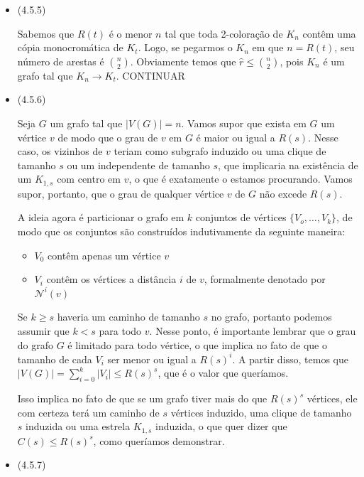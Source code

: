 \documentclass{article}
\begin{document}
\begin{itemize}
	\item (4.5.5)

	      Sabemos que \(R(t)\) é o menor \(n\) tal que toda 2-coloração de \(K_n\) contêm uma cópia monocromática de \(K_t\). Logo, se pegarmos o \(K_n\) em que \(n = R(t)\), seu número de arestas é \(\binom{n}{2}\). Obviamente temos que
	      \(\hat{r} \leq \binom{n}{2}\), pois \(K_n\) é um grafo tal que \(K_n \rightarrow K_t\). CONTINUAR

	\item (4.5.6)

	      Seja \(G\) um grafo tal que \(|V(G)| = n\). Vamos supor que exista em \(G\) um vértice \(v\) de modo que o grau de \(v\) em \(G\) é maior ou igual a \(R(s)\).
	      Nesse caso, os vizinhos de \(v\) teriam como subgrafo induzido ou uma clique de tamanho \(s\) ou um independente de tamanho \(s\), que implicaria na existência de um \(K_{1, s}\) com centro em \(v\),
	      o que é exatamente o estamos procurando. Vamos supor, portanto, que o grau de qualquer vértice \(v\) de \(G\) não excede \(R(s)\).

	      A ideia agora é particionar o grafo em \(k\) conjuntos de vértices \(\{V_o, \dots, V_k\}\), de modo que os conjuntos são construídos indutivamente da seguinte maneira:

	      \begin{itemize}
		      \item \(V_0\) contêm apenas um vértice \(v\)
		      \item \(V_i\) contêm os vértices a distância \(i\) de \(v\), formalmente denotado por \(\mathcal{N}^i(v)\)
	      \end{itemize}

	      Se \(k \geq s\) haveria um caminho de tamanho \(s\) no grafo, portanto podemos assumir que \(k < s\) para todo \(v\).
	      Nesse ponto, é importante lembrar que o grau do grafo \(G\) é limitado para todo vértice, o que implica no fato de que o tamanho de cada \(V_i\)
	      ser menor ou igual a \(R(s)^i\). A partir disso, temos que \(|V(G)| = \sum_{i=0}^k |V_i| \leq R(s)^s\), que é o valor que queríamos.

	      Isso implica no fato de que se um grafo tiver mais do que \(R(s)^s\) vértices, ele com certeza terá um caminho de \(s\) vértices induzido, uma clique de tamanho \(s\) induzida
	      ou uma estrela \(K_{1, s}\) induzida, o que quer dizer que \(C(s) \leq R(s)^s\), como queríamos demonstrar.

	\item (4.5.7)


\end{itemize}
\end{document}
